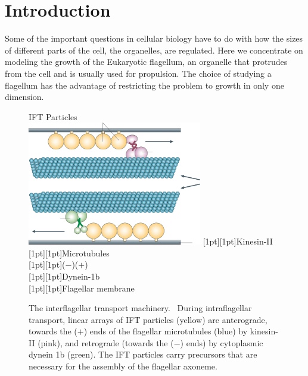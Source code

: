\section{Introduction}

Some of the important questions in cellular biology have to do with how the sizes of different parts of the cell, the organelles, are regulated.
Here we concentrate on modeling the growth of the Eukaryotic flagellum, an organelle that protrudes from the cell and is usually used for propulsion.
The choice of studying a flagellum has the advantage of restricting the problem to growth in only one dimension.
~\cite{bressloff}

\begin{figure}[!ht]
\centering
\parbox[t][2.3in][t]{4in}{
\hspace{1in}IFT Particles\\
\includegraphics[width=3in]{IFT_diagram.png}
\raisebox{1.75in}[1pt][1pt]{\hspace{2.2in}Kinesin-II}\\
\raisebox{1.39in}[1pt][1pt]{\hspace{3.04in}Microtubules}\\
\raisebox{1.5in}[1pt][1pt]{($-$)\hspace{2.2in}($+$)}\\
\raisebox{1.05in}[1pt][1pt]{\hspace{-0.15in}Dynein-1b}\\
\raisebox{0.83in}[1pt][1pt]{\hspace{2.95in}Flagellar membrane}
}
\caption{The interflagellar transport machinery.~\cite{rosenbaum2}
During intraflagellar transport,
linear arrays of IFT particles (yellow) are anterograde,
towards the ($+$) ends of the flagellar microtubules (blue)
by kinesin-II (pink), and retrograde (towards the ($-$) ends)
by cytoplasmic dynein 1b (green).
The IFT particles carry precursors that are necessary for the assembly of
the flagellar axoneme.}
\end{figure}


